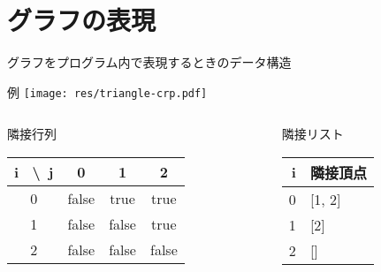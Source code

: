 \documentclass[dvipdfmx]{beamer}
\begin{document}
\section{グラフの表現}

\begin{frame}{\insertsection}
  グラフをプログラム内で表現するときのデータ構造
  \begin{block}{例}
    \centering
    \texttt{[image: res/triangle-crp.pdf]}
  \end{block}
  \begin{columns}[t]
    \begin{column}{0.48\textwidth}
      \begin{block}{隣接行列}
        \begin{table}
          \begin{tabular}{c|ccc}
            i \ \textbackslash \ j & 0 & 1 & 2 \\ \hline
            0 & false & true & true \\
            1 & false & false & true \\
            2 & false & false & false
          \end{tabular}
        \end{table}
      \end{block}
    \end{column}
    \begin{column}{0.48\textwidth}
      \begin{block}{隣接リスト}
        \begin{table}
          \begin{tabular}{r|l}
            i & 隣接頂点 \\ \hline
            0 & [1, 2] \\
            1 & [2] \\
            2 & []
          \end{tabular}
        \end{table}
      \end{block}
    \end{column}
  \end{columns}
\end{frame}
\end{document}

